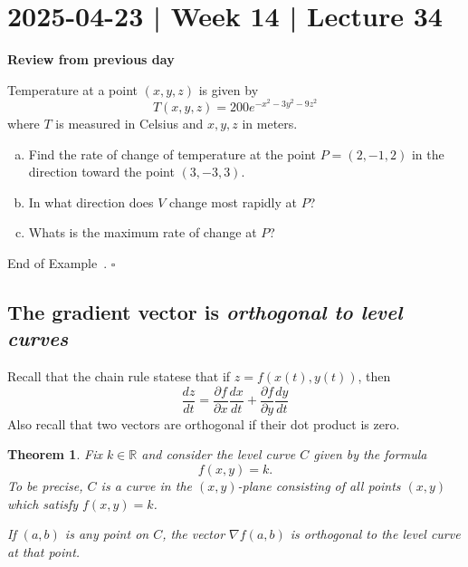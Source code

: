 \documentclass[10pt]{article}
\newtheorem{theorem}{Theorem}
\theoremstyle{definition}
\newtheorem{example}[theorem]{Example}
\renewenvironment{example}
{\begin{oldexample}}
  {\par\smallskip\hfill   End of Example~\theexample. $\square$    \par\end{oldexample}}
\newcommand{\vt}{\vskip 5mm} %
\newcommand{\Fl}{\vt\noindent\textbf} %
\newcommand{\1}[1]{\textbf{1}_{\left[#1\right]}} %
\def\R{\mathbb{R}} %
\begin{document}
\newpage
\section{2025-04-23 | Week 14 | Lecture 34}

\Fl{Review from previous day}
\begin{example}
  Temperature at a point $(x,y,z)$ is given by
  \begin{equation*}
    T(x,y,z) = 200 e^{-x^{2}-3y^{2}-9z^{2}}
  \end{equation*}
  where $T$ is measured in Celsius and $x,y,z$  in meters.
  \begin{enumerate}[(a)]
    \item Find the rate of change of temperature at the point $P=(2,-1,2)$ in
    the direction toward the point $(3,-3,3)$. 
    \item In what direction does $V$ change most rapidly at $P$?
    \item Whats is the maximum rate of change at $P$?
  \end{enumerate}
\end{example}

\subsection{The gradient vector is \textit{orthogonal to level curves}}


Recall that the chain rule statese that if $z=f(x(t),y(t))$, then
\begin{equation*}
  \frac{dz}{dt} = \frac{\partial f}{\partial x} \frac{dx}{dt} +\frac{\partial f}{\partial y} \frac{dy}{dt}
\end{equation*}
Also recall that two vectors are orthogonal if their dot product is zero.

\begin{theorem}
  Fix $k\in \R$ and consider the level curve $C$ given by the formula
  \begin{equation*}
    f(x,y) =k.
  \end{equation*}
  To be precise, $C$ is a curve in the $(x,y)$-plane consisting of all
  points $(x,y)$ which satisfy $f(x,y) = k$.

  
  If $(a,b)$ is any point on $C$, the vector $\nabla f(a,b)$ is orthogonal to the
  level curve at that point.
\end{theorem}
\end{document}
